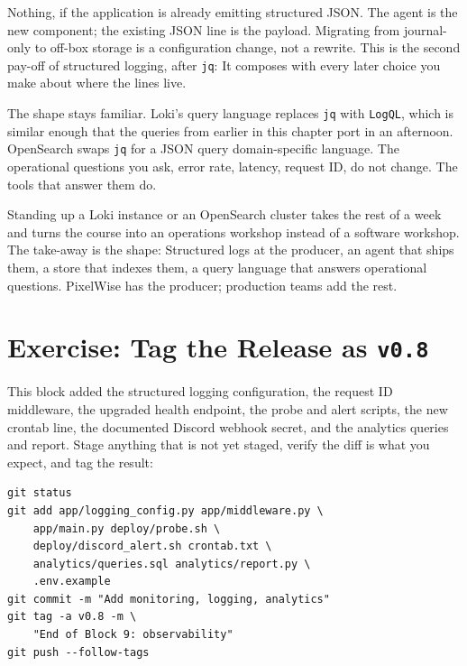  Nothing, if the
application is already emitting structured JSON. The agent is the new
component; the existing JSON line is the payload. Migrating from
journal-only to off-box storage is a configuration change, not a
rewrite. This is the second pay-off of structured logging, after
\texttt{jq}: It composes with every later choice you make about where
the lines live.

 The shape stays familiar.
Loki's query language replaces \texttt{jq} with \texttt{LogQL}, which
is similar enough that the queries from earlier in this chapter port
in an afternoon. OpenSearch swaps \texttt{jq} for a JSON query
domain-specific language. The operational questions you ask, error
rate, latency, request ID, do not change. The tools that answer them
do.

Standing up a Loki instance or an OpenSearch cluster takes the rest of
a week and turns the course into an operations workshop instead of a
software workshop. The take-away is the shape: Structured logs at the
producer, an agent that ships them, a store that indexes them, a query
language that answers operational questions. PixelWise has the
producer; production teams add the rest.



\newpage
\section{Exercise: Tag the Release as \texttt{v0.8}}

This block added the structured logging configuration, the request ID
middleware, the upgraded health endpoint, the probe and alert scripts,
the new crontab line, the documented Discord webhook secret, and the
analytics queries and report. Stage anything that is not yet staged,
verify the diff is what you expect, and tag the result:

\begin{verbatim}
git status
git add app/logging_config.py app/middleware.py \
    app/main.py deploy/probe.sh \
    deploy/discord_alert.sh crontab.txt \
    analytics/queries.sql analytics/report.py \
    .env.example
git commit -m "Add monitoring, logging, analytics"
git tag -a v0.8 -m \
    "End of Block 9: observability"
git push --follow-tags
\end{verbatim}

